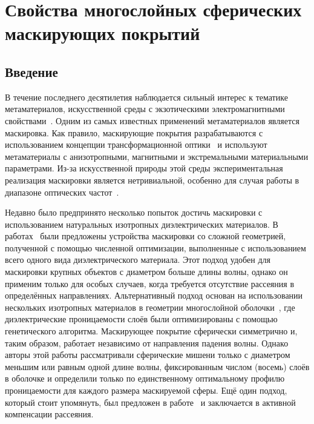 \chapter{ Свойства многослойных сферических маскирующих
  покрытий} \label{chapt3}
\section{Введение}
В течение последнего десятилетия наблюдается сильный интерес к
тематике метаматериалов, искусственной среды с экзотическими
электромагнитными свойствами~\cite{Smith-2004,
  Schurig-2006, Shalaev-2007, Kivshar-2012}. Одним из самых известных
применений метаматериалов является маскировка. Как правило,
маскирующие покрытия разрабатываются с использованием концепции
трансформационной оптики~\cite{pendry_TO, Leonhardt-2006} и
используют метаматериалы с анизотропными, магнитными и экстремальными
материальными параметрами. Из-за искусственной природы этой среды
экспериментальная реализация маскировки является нетривиальной,
особенно для случая работы в диапазоне оптических
частот~\cite{Kildishev:2011, alu, XU-Su:120408, Alu-2005}. 

Недавно было предпринято несколько попыток достичь маскировки с
использованием натуральных изотропных диэлектрических материалов. В
работах~\cite{Sigmund-AllDiel-2011, smith-3dprinterCloak-2013,
  Fujii_topolOpti_theory_2013,
  ma-experiment-topology-2013,LayeredShell,MOP:MOP27024} были
предложены устройства маскировки со сложной геометрией, полученной
с помощью численной оптимизации, выполненные с использованием всего
одного вида диэлектрического материала.  Этот подход удобен для
маскировки крупных объектов с диаметром больше длины волны, однако он
применим только для особых случаев, когда требуется отсутствие рассеяния в
определённых направлениях. Альтернативный подход основан
на использовании нескольких изотропных материалов в геометрии
многослойной оболочки~\cite{Semouchkina-2013}, где
диэлектрические проницаемости слоёв были оптимизированы с помощью
генетического алгоритма. Маскирующее покрытие сферически симметрично
и, таким образом, работает независимо от направления падения
волны. Однако авторы этой работы рассматривали сферические
мишени только с диаметром меньшим или равным одной длине волны,
фиксированным числом (восемь) слоёв в оболочке и определили только по
единственному оптимальному профилю проницаемости для каждого размера маскируемой сферы.
Ещё один подход, который стоит упомянуть, был предложен в
работе~\cite{Elefteriades_ActiveCloak_2013} и заключается в активной
компенсации рассеяния.

